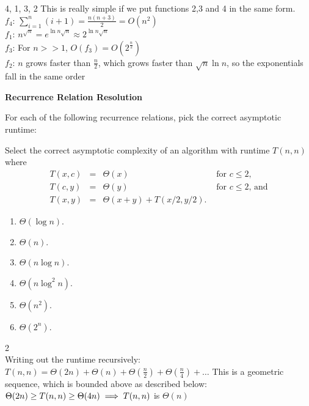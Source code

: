 \documentclass[12pt,twoside]{article}
\begin{document}
\begin{problems}
\begin{problemparts}
\ifsolution \solution{}
4, 1, 3, 2
This is really simple if we put functions 2,3 and 4 in the same form.
\\$f_4$: $\displaystyle\sum_{i = 1}^{n} (i + 1) = \frac{n(n+3)}{2} = O(n^2)$
\\$f_1$: $n^{\sqrt{n}} = e^{\ln{n}\sqrt{n}} \approx 2^{\ln{n}\sqrt{n}}$
\\$f_3$: For $n>>1$, $O(f_3) = O(2^{\frac{n}{2}})$
\\$f_2$: $n$ grows faster than $\frac{n}{2}$, which grows faster than $\sqrt{n}\ln{n}$, so the exponentials fall in the same order


\fi

\end{problemparts}

\problem {} \textbf{Recurrence Relation Resolution}

For each of the following recurrence relations,
pick the correct asymptotic runtime:

\begin{problemparts}

\problempart {}
Select the correct asymptotic complexity
of an algorithm with runtime $T(n, n)$
where 
$$
\begin{array}{rcll}
T(x, c) &=& \Theta(x) & \textrm{ for $c \le 2$}, \\
T(c, y) &=& \Theta(y) & \textrm{ for $c \le 2$, and} \\
T(x, y) &=& \Theta(x + y) + T(x / 2, y / 2).
\end{array}
$$

\begin{enumerate}
\item $\Theta(\log n)$.
\item $\Theta(n)$.
\item $\Theta(n \log n)$.
\item $\Theta(n \log^2 n)$.
\item $\Theta(n^2)$.
\item $\Theta(2^n)$.
\end{enumerate}

\ifsolution \solution{}
2
\\Writing out the runtime recursively:
\\$T(n,n) = \Theta(2n) + \Theta(n) + \Theta(\frac{n}{2}) + \Theta(\frac{n}{4}) + \ldots$
This is a geometric sequence, which is bounded above as described below:
\\$\Theta(2n) \geq T(n,n) \geq \Theta(4n) \\ \implies T(n,n)$ is $\Theta(n)$
\fi


\end{problemparts}
\end{problems}
\end{document}
